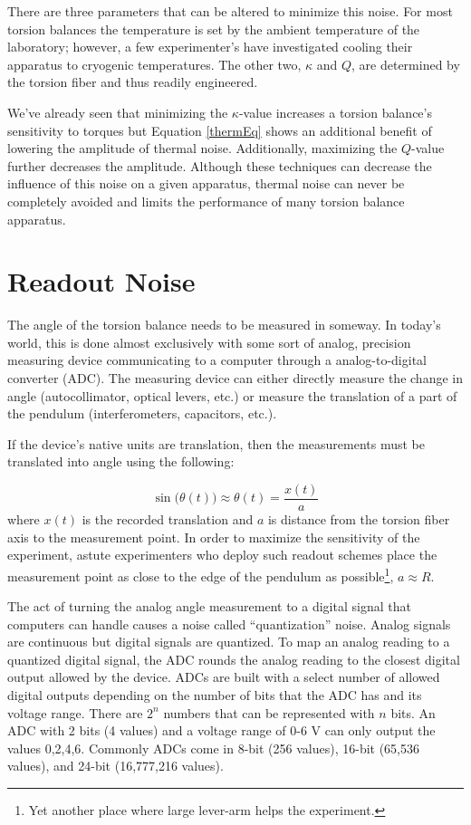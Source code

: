 \documentclass{book}
\begin{document}
There are three parameters that can be altered to minimize this noise. For most torsion balances the temperature is set by the ambient temperature of the laboratory; however, a few experimenter's have investigated cooling their apparatus to cryogenic temperatures. The other two, $\kappa$ and $Q$, are determined by the torsion fiber and thus readily engineered. 

We've already seen that minimizing the $\kappa$-value increases a torsion balance's sensitivity to torques but Equation \ref{thermEq} shows an additional benefit of lowering the amplitude of thermal noise. Additionally, maximizing the $Q$-value further decreases the amplitude. Although these techniques can decrease the influence of this noise on a given apparatus, thermal noise can never be completely avoided and limits the performance of many torsion balance apparatus.

\section{Readout Noise}\label{readout}

\quad The angle of the torsion balance needs to be measured in someway. In today's world, this is done almost exclusively with some sort of analog, precision measuring device communicating to a computer through a analog-to-digital converter (ADC). The measuring device can either directly measure the change in angle (autocollimator, optical levers, etc.) or measure the translation of a part of the pendulum (interferometers, capacitors, etc.). 

If the device's native units are translation, then the measurements must be translated into angle using the following:

\begin{equation}
\sin\big(\theta(t)\big)\approx \theta(t)=\frac{x(t)}{a}
\end{equation}
where $x(t)$ is the recorded translation and $a$ is distance from the torsion fiber axis to the measurement point. In order to maximize the sensitivity of the experiment, astute experimenters who deploy such readout schemes place the measurement point as close to the edge of the pendulum as possible\footnote{Yet another place where large lever-arm helps the experiment.}, $a\approx R$. 

The act of turning the analog angle measurement to a digital signal that computers can handle causes a noise called ``quantization'' noise. Analog signals are continuous but digital signals are quantized. To map an analog reading to a quantized digital signal, the ADC rounds the analog reading to the closest digital output allowed by the device. ADCs are built with a select number of allowed digital outputs depending on the number of bits that the ADC has and its voltage range. There are $2^n$ numbers that can be represented with $n$ bits. An ADC with 2 bits (4 values) and a voltage range of 0-6 V can only output the values 0,2,4,6. Commonly ADCs come in 8-bit (256 values), 16-bit (65,536 values), and 24-bit (16,777,216 values). 
\end{document}
